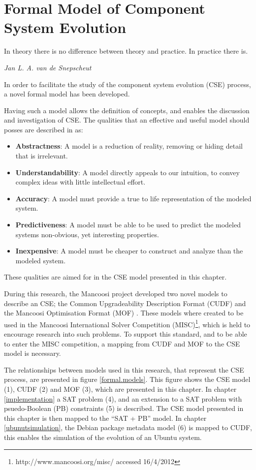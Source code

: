 \chapter{Formal Model of Component System Evolution}
\label{formal}
\epigraph{In theory there is no difference between theory and practice. In practice there is.}
{\textit{Jan L. A. van de Snepscheut}}
In order to facilitate the study of the component system evolution (CSE) process, a novel formal model has been developed.

Having such a model allows the definition of concepts, and enables the discussion and investigation of CSE.
The qualities that an effective and useful model should posses are described in \citep{Selic2003} as:
\begin{itemize}
  \item \textbf{Abstractness}: A model is a reduction of reality, removing or hiding detail that is irrelevant.
  \item \textbf{Understandability}: A model directly appeals to our intuition, to convey complex ideas with little intellectual effort.
  \item \textbf{Accuracy}: A model must provide a true to life representation of the modeled system.
  \item \textbf{Predictiveness}: A model must be able to be used to predict the modeled systems non-obvious, yet interesting properties.
  \item \textbf{Inexpensive}: A model must be cheaper to construct and analyze than the modeled system.
\end{itemize}
These qualities are aimed for in the CSE model presented in this chapter.

During this research, the Mancoosi project developed two novel models to describe an CSE;
the Common Upgradeability Description Format (CUDF) \citep{treinen2009common} 
and the Mancoosi Optimisation Format (MOF) \citep{abate2011}.
These models where created to be used in the Mancoosi International Solver Competition (MISC)\footnote{http://www.mancoosi.org/misc/ accessed 16/4/2012},
which is held to encourage research into such problems.
To support this standard, and to be able to enter the MISC competition, a mapping from CUDF and MOF to the CSE model is necessary.   

The relationships between models used in this research, that represent the CSE process, are presented in figure \ref{formal.models}.
This figure shows the CSE model (1),
CUDF (2) and MOF (3), which are presented in this chapter.
In chapter \ref{implementation} a SAT problem (4), and an extension to a SAT problem with psuedo-Boolean (PB) \citep{dixon2004automating} constraints (5) is described.
The CSE model presented in this chapter is then mapped to the ``SAT + PB'' model.
In chapter \ref{ubunutsimulation}, the Debian package metadata model (6) is mapped to CUDF, this enables the simulation of the evolution of an Ubuntu system. 

